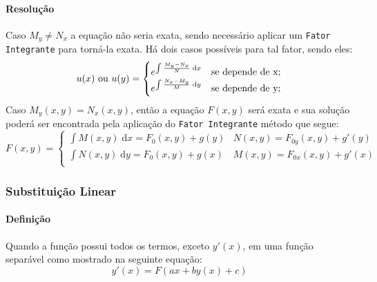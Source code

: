 \documentclass{article}
\begin{document}
                \paragraph{Resolução}Caso $M_{y}\neq N_{x}$ a equação não seria exata, sendo necessário aplicar um \texttt{Fator Integrante} para torná-la exata. Há dois casos possíveis para tal fator, sendo eles:
                    \begin{equation*}
                        u(x) \text{ ou } u(y) =
                        \begin{cases}
                            e^{\int{\frac{M_{y}-N_{x}}{N}\;\text{d}x}} & \text{se depende de } $x$;\\

                            e^{\int{\frac{N_{x}-M_{y}}{M}\;\text{d}y}} & \text{se depende de } $y$;\\
                        \end{cases}
                    \end{equation*}
                Caso $M_{y}(x,y) = N_{x}(x,y)$, então a equação $F(x,y)$ será exata e sua solução poderá ser encontrada pela aplicação do \texttt{Fator Integrante} método que segue:
                    \begin{equation}
                        F(x,y) = 
                        \begin{cases}
                            \int M(x,y)\;\text{d}x = F_{0}(x,y) + g(y)&
                            N(x,y) = F_{0y}(x,y)+g'(y)\\

                            \int N(x,y)\;\text{d}y = F_{0}(x,y) + g(x)&
                            M(x,y) = F_{0x}(x,y)+g'(x)\\
                        \end{cases}
                    \end{equation}

            \subsubsection{Substituição Linear}
                \paragraph{Definição}Quando a função possui todos os termos, exceto $y'(x)$, em uma função separável como mostrado na seguinte equação:
                    \begin{equation*}
                        y'(x) = F(ax+by(x)+c)
                    \end{equation*}
\end{document}
